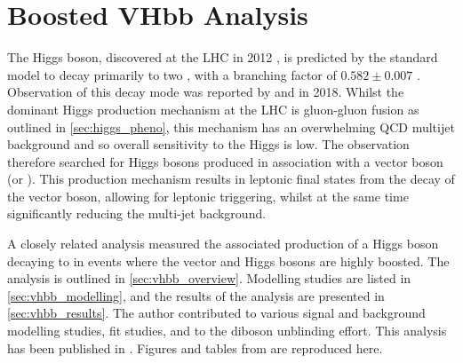 \chapter{Boosted VHbb Analysis}\label{chap:vhbb_boosted}

The Higgs boson, discovered at the LHC in 2012 \cite{HIGG-2012-27,CMS-HIG-12-028}, is predicted by the standard model to decay primarily to two \bquarks, with a branching factor of $0.582 \pm 0.007$ \cite{deFlorian:2016spz}. 
Observation of this decay mode was reported by \ATLAS \cite{HIGG-2018-04} and \CMS \cite{CMS-HIG-18-016} in 2018.
Whilst the dominant Higgs production mechanism at the LHC is gluon-gluon fusion as outlined in \cref{sec:higgs_pheno}, this mechanism has an overwhelming QCD multijet background and so overall sensitivity to the Higgs is low.
The \hbb observation therefore searched for Higgs bosons produced in association with a vector boson (\Wboson or \Zboson).
This production mechanism results in leptonic final states from the decay of the vector boson, allowing for leptonic triggering, whilst at the same time significantly reducing the multi-jet background.

A closely related analysis \cite{HIGG-2018-52} measured the associated production of a Higgs boson decaying to \bquarks in events where the vector and Higgs bosons are highly boosted.
The analysis is outlined in \cref{sec:vhbb_overview}.
Modelling studies are listed in \cref{sec:vhbb_modelling}, and the results of the analysis are presented in \cref{sec:vhbb_results}.
The author contributed to various signal and background modelling studies, fit studies, and to the diboson unblinding effort.
This analysis has been published in .
Figures and tables from  are reproduced here.

